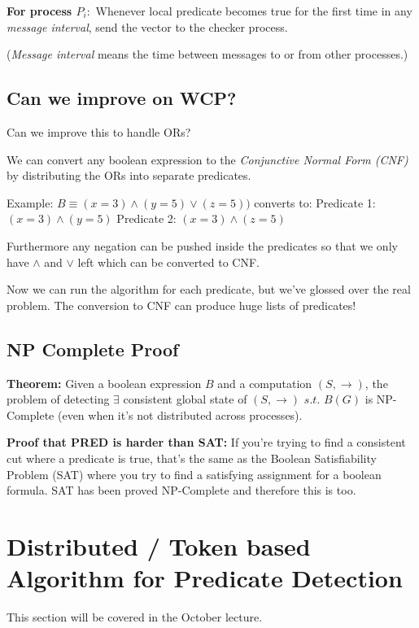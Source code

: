 \documentclass[twoside]{article}
\begin{document}
\textbf{For process $P_i:$}\newline
Whenever local predicate becomes true for the first time in any \textit{message interval}, send the vector to the checker process.

(\textit{Message interval} means the time between messages to or from other processes.)

\subsection{Can we improve on WCP?}

Can we improve this to handle ORs?

We can convert any boolean expression to the \textit{Conjunctive Normal Form (CNF)} by distributing the ORs into separate predicates.

Example:\newline
$B\equiv(x=3)\land(y=5)\lor(z=5))$
converts to:\newline
Predicate 1: $(x=3) \land (y=5)$
Predicate 2: $(x=3) \land (z=5)$

Furthermore any negation can be pushed inside the predicates so that we only have $\land$ and $\lor$ left which can be converted to CNF.

Now we can run the algorithm for each predicate, but we've glossed over the real problem. The conversion to CNF can produce huge lists of predicates!

\subsection{NP Complete Proof}

\textbf{Theorem:}\newline
Given a boolean expression $B$ and a computation $(S, \rightarrow)$, the problem of detecting $\exists$ consistent global state of $(S, \rightarrow)$ $s.t.$ $B(G)$ is NP-Complete (even when it's not distributed across processes).

\textbf{Proof that PRED is harder than SAT:}\newline
If you're trying to find a consistent cut where a predicate is true, that's the same as the Boolean Satisfiability Problem (SAT) where you try to find a satisfying assignment for a boolean formula. SAT has been proved NP-Complete and therefore this is too.

\section{Distributed / Token based Algorithm for Predicate Detection}

This section will be covered in the October lecture.
\end{document}
